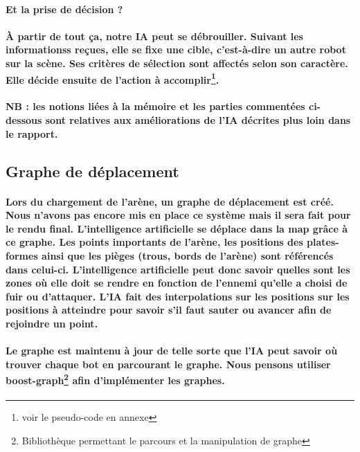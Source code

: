 \paragraph{\textbf{Et la prise de décision ?}}

\paragraph{\`A partir de tout ça, notre IA peut se débrouiller. Suivant les informationss reçues, elle se fixe une cible, c'est-à-dire un autre robot sur la scène. Ses critères de sélection sont affectés selon son caractère. Elle décide ensuite de l'action à accomplir\footnote{voir le pseudo-code en annexe}.}

\paragraph{NB : les notions liées à la mémoire et les parties commentées ci-dessous sont relatives aux améliorations de l'IA décrites plus loin dans le rapport.}


\newpage
\subsection{Graphe de déplacement}
\vspace{0.5cm}

\paragraph{Lors du chargement de l'arène, un graphe de déplacement est créé. Nous n'avons pas encore mis en place ce système mais il sera fait pour le rendu final. L'intelligence artificielle se déplace dans la map grâce à ce graphe. Les points importants de l'arène, les positions des plates-formes ainsi que les pièges (trous, bords de l'arène) sont référencés dans celui-ci. L'intelligence artificielle peut donc savoir quelles sont les zones où elle doit se rendre en fonction de l'ennemi qu'elle a choisi de fuir ou d'attaquer. L'IA fait des interpolations sur les positions sur les positions à atteindre pour savoir s'il faut sauter ou avancer afin de rejoindre un point.}

\paragraph{Le graphe est maintenu à jour de telle sorte que l'IA peut savoir où trouver chaque bot en parcourant le graphe. Nous pensons utiliser boost-graph\footnote{Bibliothèque permettant le parcours et la manipulation de graphe} afin d'implémenter les graphes.}


